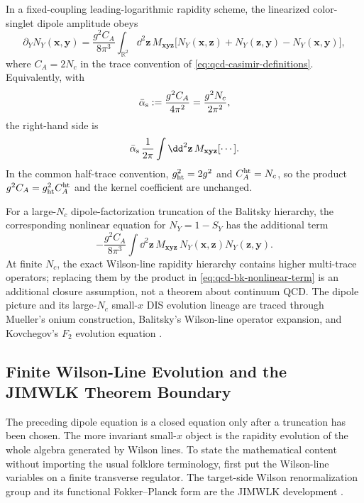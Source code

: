 \begin{hypothesis}
\label{hyp:qcd-leading-log-small-x-setup}
In a fixed-coupling leading-logarithmic rapidity scheme, the linearized
color-singlet dipole amplitude obeys
\begin{equation}
  \partial_Y N_Y(\mathbf x,\mathbf y)
  =
  \frac{g^2 C_A}{8\pi^3}
  \int_{\mathbb R^2}\dd^2\mathbf z\,
  M_{\mathbf x\mathbf y\mathbf z}
  \bigl[
    N_Y(\mathbf x,\mathbf z)
    +N_Y(\mathbf z,\mathbf y)
    -N_Y(\mathbf x,\mathbf y)
  \bigr],
  \label{eq:qcd-coordinate-bfkl-equation}
\end{equation}
where \(C_A=2N_c\) in the trace convention of
\eqref{eq:qcd-casimir-definitions}.  Equivalently, with
\[
  \bar\alpha_{\rm s}:=\frac{g^2C_A}{4\pi^2}
  =
  \frac{g^2N_c}{2\pi^2},
\]
the right-hand side is
\[
  \bar\alpha_{\rm s}\,
  \frac1{2\pi}
  \int\dd^2\mathbf z\,M_{\mathbf x\mathbf y\mathbf z}[\cdots].
\]
In the common half-trace convention,
\(g_{\rm ht}^2=2g^2\) and \(C_A^{\rm ht}=N_c\), so the product
\(g^2C_A=g_{\rm ht}^2C_A^{\rm ht}\) and the kernel coefficient are unchanged.

For a large-\(N_c\) dipole-factorization truncation of the Balitsky hierarchy,
the corresponding nonlinear equation for \(N_Y=1-S_Y\) has the additional
term
\begin{equation}
  -\frac{g^2 C_A}{8\pi^3}
  \int\dd^2\mathbf z\,
  M_{\mathbf x\mathbf y\mathbf z}\,
  N_Y(\mathbf x,\mathbf z)N_Y(\mathbf z,\mathbf y).
  \label{eq:qcd-bk-nonlinear-term}
\end{equation}
At finite \(N_c\), the exact Wilson-line rapidity hierarchy contains higher
multi-trace operators; replacing them by the product in
\eqref{eq:qcd-bk-nonlinear-term} is an additional closure assumption, not a
theorem about continuum QCD.
The dipole picture and its large-\(N_c\) small-\(x\) DIS evolution lineage are
traced through Mueller's onium construction, Balitsky's Wilson-line operator
expansion, and Kovchegov's \(F_2\) evolution equation
\cite{Mueller1994SoftGluons,Balitsky1996HighEnergy,
Kovchegov1999SmallXF2}.
\end{hypothesis}

\subsection{Finite Wilson-Line Evolution and the JIMWLK Theorem Boundary}
\label{subsec:qcd-finite-jimwlk-boundary}

The preceding dipole equation is a closed equation only after a truncation has
been chosen.  The more invariant small-\(x\) object is the rapidity evolution
of the whole algebra generated by Wilson lines.  To state the mathematical
content without importing the usual folklore terminology, first put the
Wilson-line variables on a finite transverse regulator.
The target-side Wilson renormalization group and its functional
Fokker--Planck form are the JIMWLK development
\cite{JalilianMarianKovnerLeonidovWeigert1998HighDensity,
JalilianMarianKovnerWeigert1998FiniteDensity,
IancuLeonidovMcLerran2001CGC,Weigert2002Unitarity}.

